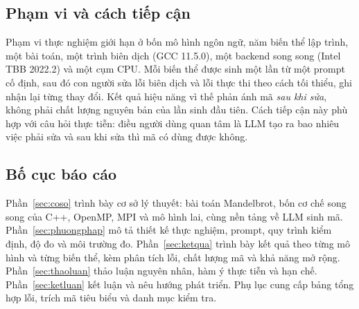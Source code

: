 \subsection{Phạm vi và cách tiếp cận}

Phạm vi thực nghiệm giới hạn ở bốn mô hình ngôn ngữ, năm biến thể lập trình, một
bài toán, một trình biên dịch (GCC 11.5.0), một backend song song (Intel TBB
2022.2) và một cụm CPU. Mỗi biến thể được sinh một lần từ một prompt cố định,
sau đó con người sửa lỗi biên dịch và lỗi thực thi theo cách tối thiểu, ghi nhận
lại từng thay đổi. Kết quả hiệu năng vì thế phản ánh mã \emph{sau khi sửa}, không
phải chất lượng nguyên bản của lần sinh đầu tiên. Cách tiếp cận này phù hợp với
câu hỏi thực tiễn: điều người dùng quan tâm là LLM tạo ra bao nhiêu việc phải sửa
và sau khi sửa thì mã có dùng được không.

\subsection{Bố cục báo cáo}

Phần~\ref{sec:coso} trình bày cơ sở lý thuyết: bài toán Mandelbrot, bốn cơ chế
song song của C++, OpenMP, MPI và mô hình lai, cùng nền tảng về LLM sinh mã.
Phần~\ref{sec:phuongphap} mô tả thiết kế thực nghiệm, prompt, quy trình kiểm định,
độ đo và môi trường đo. Phần~\ref{sec:ketqua} trình bày kết quả theo từng mô hình
và từng biến thể, kèm phân tích lỗi, chất lượng mã và khả năng mở rộng.
Phần~\ref{sec:thaoluan} thảo luận nguyên nhân, hàm ý thực tiễn và hạn chế.
Phần~\ref{sec:ketluan} kết luận và nêu hướng phát triển. Phụ lục cung cấp bảng
tổng hợp lỗi, trích mã tiêu biểu và danh mục kiểm tra.
